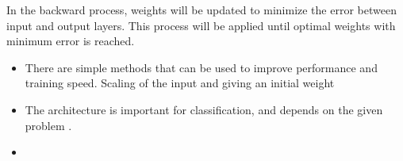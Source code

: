 In the backward process, weights will be updated to minimize the error between input and output layers.
This process will be applied until optimal weights with minimum error is reached.\citep{Hameed2016}


\begin{itemize}
\item There are simple methods that can be used to improve performance and training speed. Scaling of the input and giving an initial weight \citep{Duda2000}
\item The architecture is important for classification, and depends on the given problem \citep{Duda2000}. 
\item  
\end{itemize}



